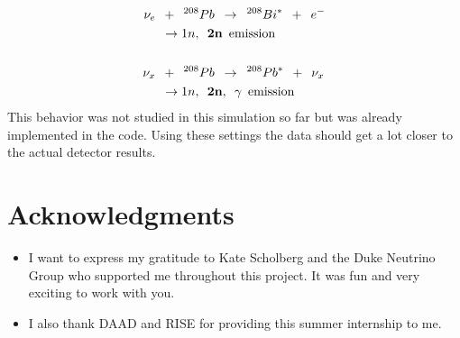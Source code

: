 \documentclass[12pt]{article}
\begin{document}
 \begin{align}
  \nu_{e}\hspace{0.5em}&+\hspace{0.5em}^{208}Pb\hspace{0.5em}\rightarrow\hspace{0.5em}^{208}Bi^{*}\hspace{0.5em}+\hspace{0.5em}e^-\label{eq:reaction}\\ &\rightarrow 1n,\hspace{0.5em}\bf{2n}\hspace{0.5em}\text{emission}\nonumber\\\nonumber\\
  \nu_{x}\hspace{0.5em}&+\hspace{0.5em}^{208}Pb\hspace{0.5em}\rightarrow\hspace{0.5em}^{208}Pb^{*}\hspace{0.5em}+\hspace{0.5em}\nu_{x}\nonumber\\ &\rightarrow 1n,\hspace{0.5em}\bf{2n},\hspace{0.5em}\gamma\hspace{0.5em}\text{emission}\nonumber
 \end{align}
 This behavior was not studied in this simulation so far but was already implemented in the code. Using these settings the data should get a lot closer to the actual detector results. 


\section*{Acknowledgments}
\begin{itemize}
  \item[] I want to express my gratitude to Kate Scholberg and the Duke Neutrino Group who supported me throughout this project. It was fun and very exciting to work with you.
  \item[] I also thank DAAD and RISE for providing this summer internship to me.
\end{itemize}



\end{document}
